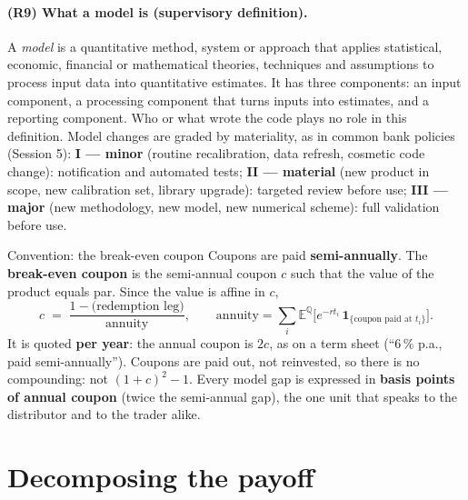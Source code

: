 \documentclass[11pt,a4paper]{article}
\newcommand{\E}{\mathbb{E}^{\mathbb{Q}}}
\begin{document}
\paragraph{(R9) What a model is (supervisory definition).} A \emph{model} is a quantitative method, system
or approach that applies statistical, economic, financial or mathematical theories, techniques and
assumptions to process input data into quantitative estimates. It has three components: an input
component, a processing component that turns inputs into estimates, and a reporting component.
Who or what wrote the code plays no role in this definition. Model changes are graded by materiality,
as in common bank policies (Session 5): \textbf{I --- minor} (routine recalibration, data refresh, cosmetic code
change): notification and automated tests; \textbf{II --- material} (new product in scope, new calibration
set, library upgrade): targeted review before use; \textbf{III --- major} (new methodology, new model, new
numerical scheme): full validation before use.

\begin{navybox}{Convention: the break-even coupon}
Coupons are paid \textbf{semi-annually}. The \textbf{break-even coupon} is the semi-annual coupon $c$ such
that the value of the product equals par. Since the value is affine in $c$,
\[
  c \;=\; \frac{1 - \text{(redemption leg)}}{\text{annuity}}, \qquad
  \text{annuity} = \sum_i \E\big[e^{-r t_i}\, \mathbf{1}_{\{\text{coupon paid at } t_i\}}\big].
\]
It is quoted \textbf{per year}: the annual coupon is $2c$, as on a term sheet (``6\,\% p.a., paid semi-annually'').
Coupons are paid out, not reinvested, so there is no compounding: not $(1+c)^2 - 1$. Every model
gap is expressed in \textbf{basis points of annual coupon} (twice the semi-annual gap), the one unit
that speaks to the distributor and to the trader alike.
\end{navybox}

\section{Decomposing the payoff}
\end{document}

